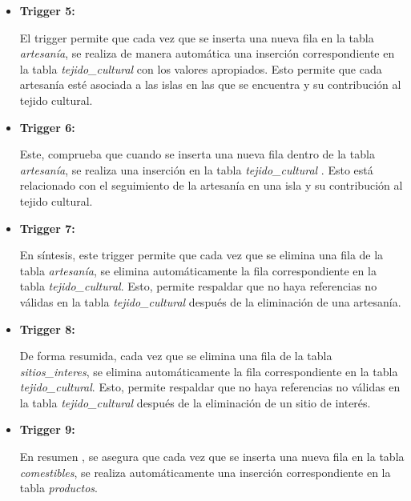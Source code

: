 \documentclass[11pt]{report}
\begin{document}
\begin{itemize}
      \item \textbf{Trigger 5:} 
            \lstset{style=mystyle}
            

El trigger permite que cada vez que se inserta una nueva fila en la tabla \emph{artesanía}, se realiza de manera automática una inserción correspondiente en la tabla \emph{tejido\_cultural} con los valores apropiados. Esto permite que cada artesanía esté asociada a las islas en las que se encuentra y su contribución al tejido cultural.  

      \item \textbf{Trigger 6:} 
            \lstset{style=mystyle}
            

Este, comprueba que cuando se inserta una nueva fila dentro de la tabla \emph{artesanía}, se realiza una inserción en la tabla \emph{tejido\_cultural} . Esto está relacionado con el seguimiento de la artesanía en una isla y su contribución al tejido cultural.

      \item \textbf{Trigger 7:} 
            \lstset{style=mystyle}
            

En síntesis, este trigger permite que cada vez que se elimina una fila de la tabla \emph{artesanía}, se elimina automáticamente la fila correspondiente en la tabla \emph{tejido\_cultural}. Esto, permite respaldar que no haya referencias no válidas en la tabla \emph{tejido\_cultural} después de la eliminación de una artesanía.

      \item \textbf{Trigger 8:} 
            \lstset{style=mystyle}
            

De forma resumida, cada vez que se elimina una fila de la tabla \emph{sitios\_interes}, se elimina automáticamente la fila correspondiente en la tabla \emph{tejido\_cultural}. Esto, permite respaldar que no haya referencias no válidas en la tabla \emph{tejido\_cultural} después de la eliminación de un sitio de interés.

      \item \textbf{Trigger 9:} 
            \lstset{style=mystyle}
            

En resumen , se asegura que cada vez que se inserta una nueva fila en la tabla \emph{comestibles}, se realiza automáticamente una inserción correspondiente en la tabla \emph{productos}. 


\end{itemize}
\end{document}
